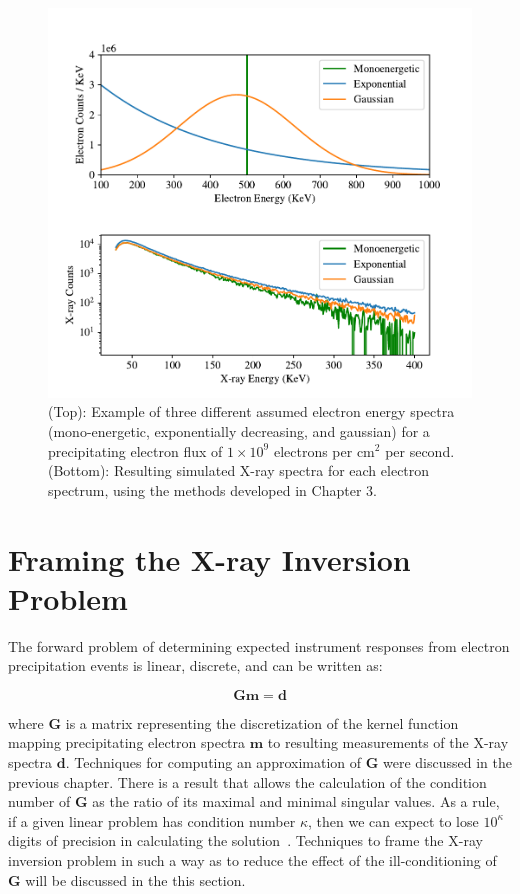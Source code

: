 \begin{figure}[p]
\label{why_ill_conditioned}
\centering
\includegraphics[width=\textwidth]{figures/chapter_4/why_ill_conditioned/why_ill_conditioned.pdf}
\caption{(Top): Example of three different assumed electron energy spectra (mono-energetic, exponentially decreasing, and gaussian) for a precipitating electron flux of $1\times10^9$ electrons per $\mbox{cm}^2$ per second. (Bottom): Resulting simulated X-ray spectra for each electron spectrum, using the methods developed in Chapter 3.} 
\end{figure}

\section{Framing the X-ray Inversion Problem}

The forward problem of determining expected instrument responses from electron precipitation events is linear, discrete, and can be written as:

$$\mathbf{G}\mathbf{m} = \mathbf{d}$$

where $\mathbf{G}$ is a matrix representing the discretization of the kernel function mapping precipitating electron spectra $\mathbf{m}$ to resulting measurements of the X-ray spectra $\mathbf{d}$. Techniques for computing an approximation of $\mathbf{G}$ were discussed in the previous chapter. There is a result that allows the calculation of the condition number of $\mathbf{G}$ as the ratio of its maximal and minimal singular values. As a rule, if a given linear problem has condition number $\kappa$, then we can expect to lose $10^\kappa$ digits of precision in calculating the solution~\citep{Cheney2008}. Techniques to frame the X-ray inversion problem in such a way as to reduce the effect of the ill-conditioning  of $\mathbf{G}$ will be discussed in the this section.

